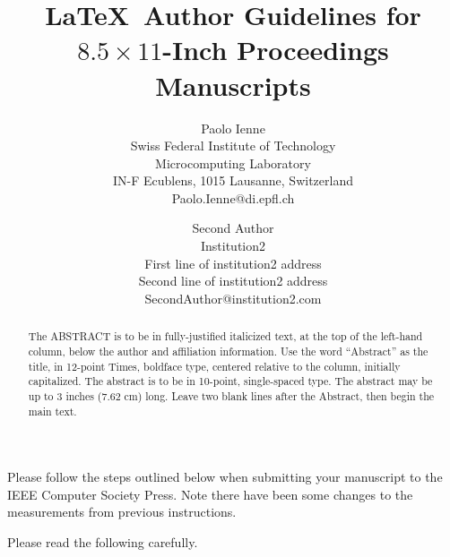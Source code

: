 \documentclass[times, 10pt,twocolumn]{article}
\begin{document}
\title{\LaTeX\ Author Guidelines 
       for {\boldmath $8.5 \times 11$-Inch} Proceedings Manuscripts}

\author{Paolo Ienne\\
Swiss Federal Institute of Technology\\ Microcomputing Laboratory \\ IN-F 
Ecublens, 1015 Lausanne, Switzerland\\ Paolo.Ienne@di.epfl.ch\\
\and
Second Author\\
Institution2\\
First line of institution2 address\\ Second line of institution2 address\\ 
SecondAuthor@institution2.com\\
}

\maketitle
\thispagestyle{empty}

\begin{abstract}
   The ABSTRACT is to be in fully-justified italicized text, at the top 
   of the left-hand column, below the author and affiliation 
   information. Use the word ``Abstract'' as the title, in 12-point 
   Times, boldface type, centered relative to the column, initially 
   capitalized. The abstract is to be in 10-point, single-spaced type. 
   The abstract may be up to 3 inches (7.62 cm) long. Leave two blank 
   lines after the Abstract, then begin the main text. 
\end{abstract}




Please follow the steps outlined below when submitting your 
manuscript to the IEEE Computer Society Press. Note there have 
been some changes to the measurements from previous instructions. 


Please read the following carefully.

\end{document}
